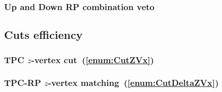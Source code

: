 % 


\subsubsection{Up and Down RP combination veto}






\subsection{Cuts efficiency}\label{sec:cutsEff}
\subsubsection{TPC \texorpdfstring{$z$}{z}-vertex cut~(\ref{enum:CutZVx})}
\subsubsection{TPC-RP \texorpdfstring{$z$}{z}-vertex matching~(\ref{enum:CutDeltaZVx})}
